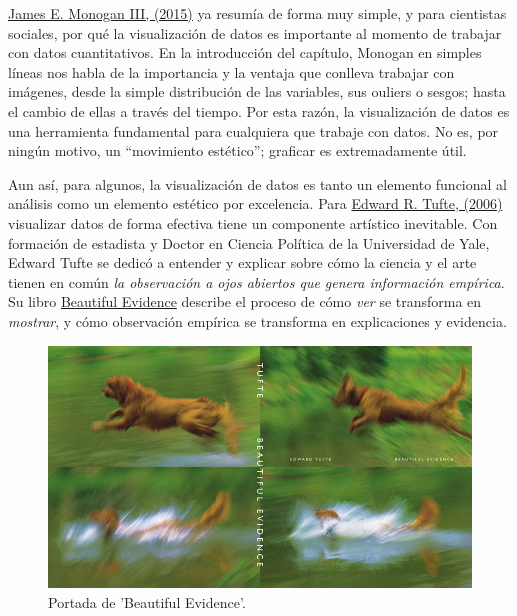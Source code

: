 \documentclass[]{book}
\begin{document}
\href{https://link.springer.com/chapter/10.1007\%2F978-3-319-23446-5_3}{James
E. Monogan III, (2015)} ya resumía de forma muy simple, y para
cientistas sociales, por qué la visualización de datos es importante al
momento de trabajar con datos cuantitativos. En la introducción del
capítulo, Monogan en simples líneas nos habla de la importancia y la
ventaja que conlleva trabajar con imágenes, desde la simple distribución
de las variables, sus ouliers o sesgos; hasta el cambio de ellas a
través del tiempo. Por esta razón, la visualización de datos es una
herramienta fundamental para cualquiera que trabaje con datos. No es,
por ningún motivo, un ``movimiento estético''; graficar es
extremadamente útil.

Aun así, para algunos, la visualización de datos es tanto un elemento
funcional al análisis como un elemento estético por excelencia. Para
\href{http://pages.mtu.edu/~hcking/Tufte_hKing.pdf}{Edward R. Tufte,
(2006)} visualizar datos de forma efectiva tiene un componente artístico
inevitable. Con formación de estadista y Doctor en Ciencia Política de
la Universidad de Yale, Edward Tufte se dedicó a entender y explicar
sobre cómo la ciencia y el arte tienen en común \emph{la observación a
ojos abiertos que genera información empírica}. Su libro
\href{https://www.amazon.com/gp/product/0961392177/102-6444562-7552168?}{Beautiful
Evidence} describe el proceso de cómo \emph{ver} se transforma en
\emph{mostrar}, y cómo observación empírica se transforma en
explicaciones y evidencia.

\begin{figure}

{\centering \includegraphics[width=1\linewidth]{00-images/dataviz_beautiful_evidence} 

}

\caption{Portada de 'Beautiful Evidence'.}\label{fig:beautiful-evidence}
\end{figure}
\end{document}
